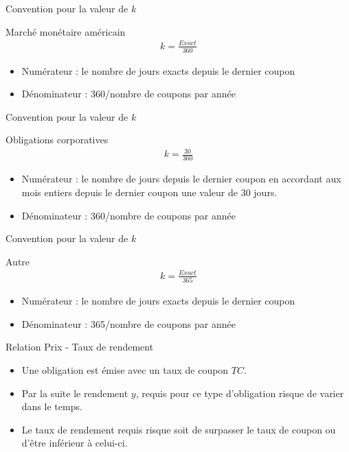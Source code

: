 \documentclass[11pt]{beamer}
\begin{document}
\begin{frame}{Convention pour la valeur de $k$}
\begin{block}{Marché monétaire américain }
\begin{align*}
k=\frac{Exact}{360}
\end{align*}
\begin{itemize}
\item Numérateur : le nombre de jours exacts depuis le dernier coupon
\item Dénominateur : 360/nombre de coupons par année
\end{itemize}
\end{block}
\end{frame}

\begin{frame}{Convention pour la valeur de $k$}
\begin{block}{Obligations corporatives }
\begin{align*}
k=\frac{30}{360}
\end{align*}
\begin{itemize}
\item Numérateur : le nombre de jours depuis le dernier coupon en accordant aux mois entiers depuis le dernier coupon une valeur de 30 jours.
\item Dénominateur : 360/nombre de coupons par année
\end{itemize}
\end{block}
\end{frame}

\begin{frame}{Convention pour la valeur de $k$}
\begin{block}{Autre }
\begin{align*}
k=\frac{Exact}{365}
\end{align*}
\begin{itemize}
\item Numérateur : le nombre de jours exacts depuis le dernier coupon
\item Dénominateur : 365/nombre de coupons par année
\end{itemize}
\end{block}
\end{frame}

\begin{frame}{Relation Prix - Taux de rendement}
\begin{itemize}
\item Une obligation est émise avec un taux de coupon $TC$. 
\item Par la suite le rendement $y$, requis pour ce type d'obligation risque de varier dans le temps.
\item Le taux de rendement requis risque soit de surpasser le taux de coupon ou d'être inférieur à celui-ci. 
\end{itemize}
\end{frame}
\end{document}
